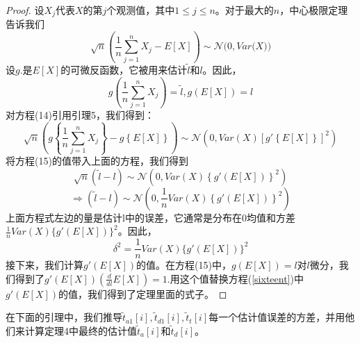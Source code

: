 \documentclass[UTF8]{ctexart}
\newtheorem*{proof}{证明}
\begin{document}
	\begin{proof}
		设$X_j$代表$X$的第$j$个观测值，其中$1\leq j \leq n$。对于最大的$n$，中心极限定理告诉我们
		\begin{equation}
		\sqrt{n}\left(\frac{1}{n}\sum_{j=1}^{n}X_j-E[X]\right)\sim\mathcal{N}\Big(0,Var\big(X\big)\Big)
		\end{equation}
		设$g{.}$是$E[X]$的可微反函数，它被用来估计$\widetilde{l}$和$l$。因此，
		\begin{equation}
		g\left(\frac{1}{n}\sum_{j=1}^{n}X_j\right)=\widetilde{l}, g\left(E[X]\right)=l
		\end{equation}
		对方程(14)引用引理5，我们得到：
		$$\sqrt{n}\left(g\left\{\frac{1}{n}\sum_{j=1}^{n}X_j\right\}-g\left\{E[X]\right\}\right)\sim\mathcal{N}\left(0,Var\left(X\right)\left[g'\left\{E[X]\right\}\right]^2\right)$$
		将方程(15)的值带入上面的方程，我们得到
		$$\sqrt{n}\left(\widetilde{l}-l\right)\sim\mathcal{N}\left(0,Var(X)\left\{g'\left(E[X]\right)\right\}^2\right)$$
		$$\Rightarrow\left(\widetilde{l}-l\right)\sim\mathcal{N}\left(0,\frac{1}{n}Var(X)\left\{g'\left(E[X]\right)\right\}^2\right)$$
		上面方程式左边的量是估计l中的误差，它通常是分布在0均值和方差\\$\frac{1}{n}Var(X)\{g'(E[X])\}^2$。因此，
		\begin{equation}\label{sixteent}
		\delta^2=\frac{1}{n}Var(X)\{g'(E[X])\}^2
		\end{equation}
		接下来，我们计算$g'(E[X])$的值。在方程(15)中，$g(E[X])=l$对$l$微分，我们得到了$g'(E[X])(\frac{d}{dl}E[X]) = 1$.用这个值替换方程(\ref{sixteent})中$g'(E[X])$的值，我们得到了定理里面的式子。
	\end{proof}
	在下面的引理中，我们推导$\widetilde{t}_{a1}[i],\widetilde{t}_{d1}[i],\widetilde{t}_t[i]$每一个估计值误差的方差，并用他们来计算定理4中最终的估计值$\widetilde{t}_a[i]$和$\widetilde{t}_d[i]$。
	
\end{document}
